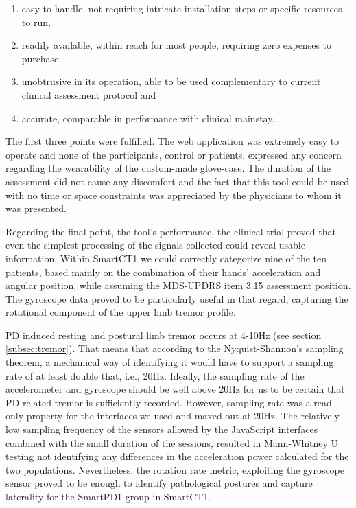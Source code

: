 \begin{enumerate}
\item easy to handle, not requiring intricate installation steps or specific resources to run, 
\item readily available, within reach for most people, requiring zero expenses to purchase,
\item unobtrusive in its operation, able to be used complementary to current clinical assessment protocol and
\item accurate, comparable in performance with clinical mainstay.
\end{enumerate}

The first three points were fulfilled. The web application was extremely easy to operate and none of the participants, control or patients, expressed any concern regarding the wearability of the custom-made glove-case. The duration of the assessment did not cause any discomfort and the fact that this tool could be used with no time or space constraints was appreciated by the physicians to whom it was presented. 

Regarding the final point, the tool's performance, the clinical trial proved that even the simplest processing of the signals collected could reveal usable information. Within \gls{SmartCT1} we could correctly categorize nine of the ten patients, based mainly on the combination of their hands' acceleration and angular position, while assuming the \gls{MDS}-\gls{UPDRS} item 3.15 assessment position. The gyroscope data proved to be particularly useful in that regard, capturing the rotational component of the upper limb tremor profile. 

\gls{PD} induced resting and postural limb tremor occurs at 4-10Hz (see section \ref{subsec:tremor}). That means that according to the Nyquist-Shannon's sampling theorem, a mechanical way of identifying it would have to support a sampling rate of at least double that, i.e., 20Hz. Ideally, the sampling rate of the accelerometer and gyroscope should be well above 20Hz for us to be certain that \gls{PD}-related tremor is sufficiently recorded. However, sampling rate was a read-only property for the interfaces we used and maxed out at 20Hz. The relatively low sampling frequency of the sensors allowed by the JavaScript interfaces combined with the small duration of the sessions, resulted in Mann-Whitney U testing not identifying any differences in the acceleration power calculated for the two populations. Nevertheless, the rotation rate metric, exploiting the gyroscope sensor proved to be enough to identify pathological postures and capture laterality for the \gls{SmartPD1} group in \gls{SmartCT1}. 


